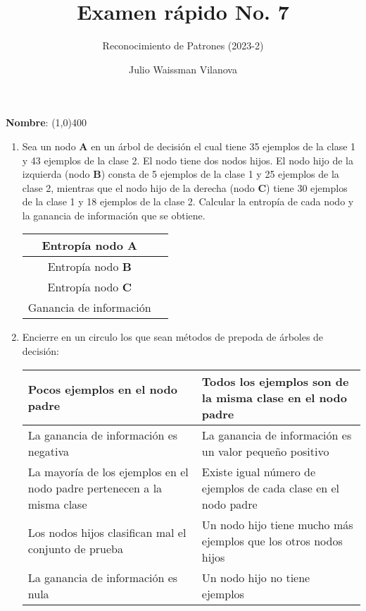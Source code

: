 \documentclass[11pt]{article}
\title{Examen rápido No. 7}
\author{Reconocimiento de Patrones (2023-2)}
\date{Julio Waissman Vilanova} %
\begin{document}
\maketitle


\textbf{Nombre}: \line(1,0){400}



\begin{enumerate}

\item Sea un nodo $\mathbf{A}$ en un árbol de decisión el cual tiene 35 ejemplos de la clase 1 y 43 ejemplos de la clase 2. El nodo tiene dos nodos hijos. El nodo hijo de la izquierda (nodo $\mathbf{B}$) consta de 5 ejemplos de la clase 1 y 25 ejemplos de la clase 2, mientras que el nodo hijo de la derecha (nodo $\mathbf{C}$) tiene 30 ejemplos de la clase 1 y 18 ejemplos de la clase 2. Calcular la entropía de cada nodo y la ganancia de información que se obtiene.

    \begin{center}
    \begin{tabular}{|c||p{5cm}|}
    \hline
    Entropía nodo $\mathbf{A}$ & \\
    \hline
    Entropía nodo $\mathbf{B}$ & \\
    \hline
    Entropía nodo $\mathbf{C}$ & \\
    \hline
    Ganancia de información & \\
    \hline
    \end{tabular}
    \end{center}
    
    \item Encierre en un circulo los que sean métodos de prepoda de árboles de decisión:

    \begin{center}
    \begin{tabular}{|p{8cm}|p{8cm}|}
    \hline
    Pocos ejemplos en el nodo padre  & Todos los ejemplos son de la misma clase en el nodo padre \\
    \hline
    La ganancia de información es negativa & La ganancia de información es un valor pequeño positivo \\
    \hline
    La mayoría de los ejemplos en el nodo padre pertenecen a la misma clase & Existe igual número de ejemplos de cada clase en el nodo padre\\
    \hline
    Los nodos hijos clasifican mal el conjunto de prueba & Un nodo hijo tiene mucho más ejemplos que los otros nodos hijos\\
    \hline
    La ganancia de información es nula & Un nodo hijo no tiene ejemplos\\  
    \hline
    \end{tabular}
    \end{center}
    

\end{enumerate}
\end{document}
